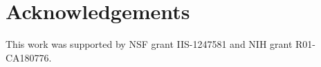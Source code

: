 \documentclass{sig-alternate-2013}
\begin{document}








\section{Acknowledgements}
This work was supported by NSF grant IIS-1247581 and NIH grant R01-CA180776.

%
%



% 
\end{document}
